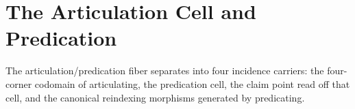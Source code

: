 \chapter{The Articulation Cell and Predication}\label{ch:predicating}

The articulation/predication fiber separates into four incidence carriers:
the four-corner codomain of articulating, the predication cell, the claim point
read off that cell, and the canonical reindexing morphisms generated by
predicating.










